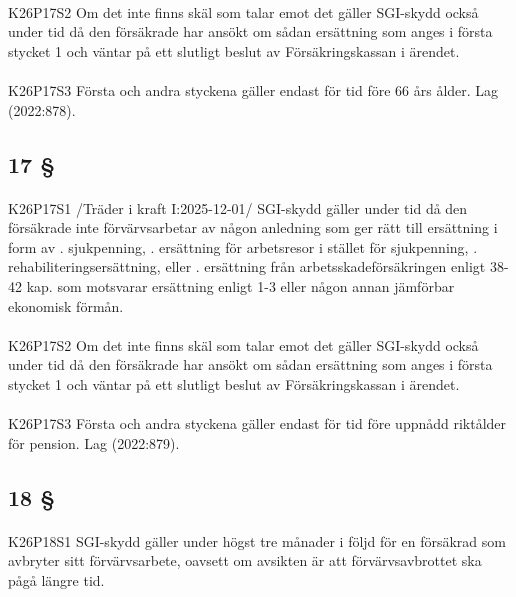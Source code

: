 \documentclass[a4paper,notitlepage,openany,10pt]{book}
\begin{document}
\paragraph*{}
{\tiny K26P17S2}
Om det inte finns skäl som talar emot det gäller SGI-skydd också under tid då den försäkrade har ansökt om sådan ersättning som anges i första stycket 1 och väntar på ett slutligt beslut av Försäkringskassan i ärendet.
\paragraph*{}
{\tiny K26P17S3}
Första och andra styckena gäller endast för tid före 66 års ålder.
Lag (2022:878).
\subsection*{17 §}
\paragraph*{}
{\tiny K26P17S1}
/Träder i kraft I:2025-12-01/
SGI-skydd gäller under tid då den försäkrade inte förvärvsarbetar av någon anledning som ger rätt till ersättning i form av
. sjukpenning,
. ersättning för arbetsresor i stället för sjukpenning,
. rehabiliteringsersättning, eller
. ersättning från arbetsskadeförsäkringen enligt 38-42 kap. som motsvarar ersättning enligt 1-3 eller någon annan jämförbar ekonomisk förmån.
\paragraph*{}
{\tiny K26P17S2}
Om det inte finns skäl som talar emot det gäller SGI-skydd också under tid då den försäkrade har ansökt om sådan ersättning som anges i första stycket 1 och väntar på ett slutligt beslut av Försäkringskassan i ärendet.
\paragraph*{}
{\tiny K26P17S3}
Första och andra styckena gäller endast för tid före uppnådd riktålder för pension.
Lag (2022:879).
\subsection*{18 §}
\paragraph*{}
{\tiny K26P18S1}
SGI-skydd gäller under högst tre månader i följd för en försäkrad som avbryter sitt förvärvsarbete, oavsett om avsikten är att förvärvsavbrottet ska pågå längre tid.
\end{document}
